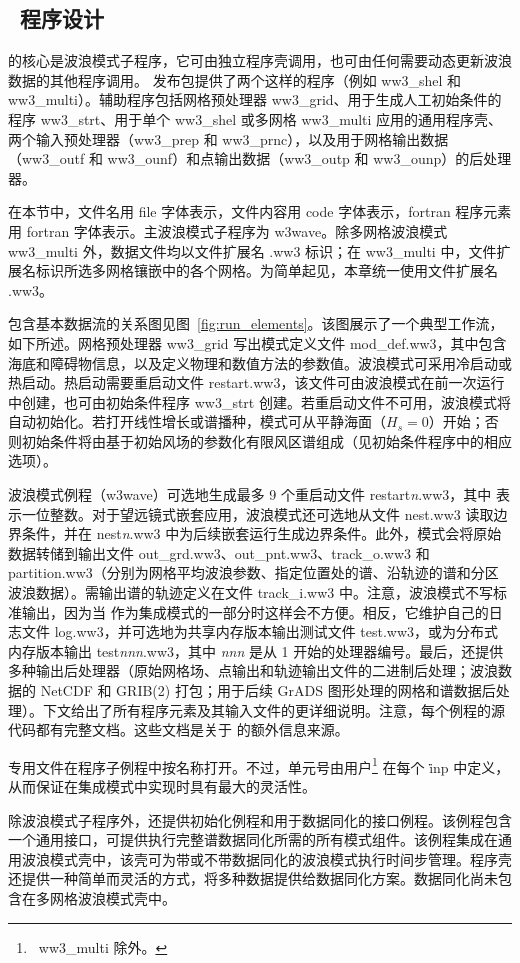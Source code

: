 \vsssub
\subsection{~程序设计} \label{run:design}
\vssub

\ws{} 的核心是波浪模式子程序，它可由独立程序壳调用，也可由任何需要动态更新波浪数据的其他程序调用。\ws{} 发布包提供了两个这样的程序（例如 {\code ww3\_shel} 和 {\code ww3\_multi}）。辅助程序包括网格预处理器 {\code ww3\_grid}、用于生成人工初始条件的程序 {\code ww3\_strt}、用于单个 {\code ww3\_shel} 或多网格 {\code ww3\_multi} 应用的通用程序壳、两个输入预处理器（{\code ww3\_prep} 和 {\code ww3\_prnc}），以及用于网格输出数据（{\code ww3\_outf} 和 {\code ww3\_ounf}）和点输出数据（{\code ww3\_outp} 和 {\code ww3\_ounp}）的后处理器。

在本节中，文件名用 {\file file} 字体表示，文件内容用 {\code code} 字体表示，{\sc fortran} 程序元素用 {\F fortran} 字体表示。主波浪模式子程序为 {\F w3wave}。除多网格波浪模式 {\file ww3\_multi} 外，数据文件均以文件扩展名 {\file .ww3} 标识；在 {\file ww3\_multi} 中，文件扩展名标识所选多网格镶嵌中的各个网格。为简单起见，本章统一使用文件扩展名 {\file .ww3}。

包含基本数据流的关系图见图~\ref{fig:run_elements}。该图展示了一个典型工作流，如下所述。网格预处理器 {\code ww3\_grid} 写出模式定义文件 {\file mod\_def.ww3}，其中包含海底和障碍物信息，以及定义物理和数值方法的参数值。波浪模式可采用冷启动或热启动。热启动需要重启动文件 {\file restart.ww3}，该文件可由波浪模式在前一次运行中创建，也可由初始条件程序 {\code ww3\_strt} 创建。若重启动文件不可用，波浪模式将自动初始化。若打开线性增长或谱播种，模式可从平静海面（$H_s=0$）开始；否则初始条件将由基于初始风场的参数化有限风区谱组成（见初始条件程序中的相应选项）。

波浪模式例程（{\F w3wave}）可选地生成最多 9 个重启动文件 {\file restart{\em{n}}.ww3}，其中 {} 表示一位整数。对于望远镜式嵌套应用，波浪模式还可选地从文件 {\file nest.ww3} 读取边界条件，并在 {\file nest{\em{n}}.ww3} 中为后续嵌套运行生成边界条件。此外，模式会将原始数据转储到输出文件 {\file out\_grd.ww3}、{\file out\_pnt.ww3}、{\file track\_o.ww3} 和 {\file partition.ww3}（分别为网格平均波浪参数、指定位置处的谱、沿轨迹的谱和分区波浪数据）。需输出谱的轨迹定义在文件 {\file track\_i.ww3} 中。注意，波浪模式不写标准输出，因为当 \ws{} 作为集成模式的一部分时这样会不方便。相反，它维护自己的日志文件 {\file log.ww3}，并可选地为共享内存版本输出测试文件 {\file test.ww3}，或为分布式内存版本输出 {\file test{\em{nnn}}.ww3}，其中 {\em nnn} 是从 1 开始的处理器编号。最后，还提供多种输出后处理器（原始网格场、点输出和轨迹输出文件的二进制后处理；波浪数据的 NetCDF 和 GRIB(2) 打包；用于后续 GrADS 图形处理的网格和谱数据后处理）。下文给出了所有程序元素及其输入文件的更详细说明。注意，每个例程的源代码都有完整文档。这些文档是关于 \ws{} 的额外信息来源。



\ws{} 专用文件在程序子例程中按名称打开。不过，单元号由用户\footnote{~{\file ww3\_multi} 除外。} 在每个 {\file \.inp} 中定义，从而保证在集成模式中实现时具有最大的灵活性。

除波浪模式子程序外，还提供初始化例程和用于数据同化的接口例程。该例程包含一个通用接口，可提供执行完整谱数据同化所需的所有模式组件。该例程集成在通用波浪模式壳中，该壳可为带或不带数据同化的波浪模式执行时间步管理。程序壳还提供一种简单而灵活的方式，将多种数据提供给数据同化方案。数据同化尚未包含在多网格波浪模式壳中。
